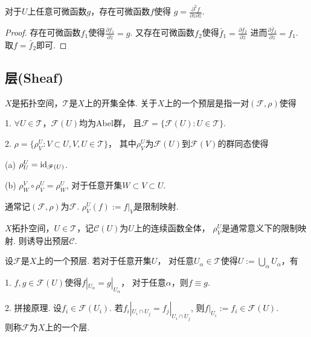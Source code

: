 \begin{corollary}
	对于$U$上任意可微函数$g$，存在可微函数$f$使得
    $g=\frac{\partial^2 f}{\partial z\partial \bar{z}}$.
\end{corollary}
		
\begin{proof}
	存在可微函数$f_1$使得$\frac{\partial f_1}{\partial \bar{z}}=g$. 
    又存在可微函数$f_2$使得$\bar{f}_1=\frac{\partial f_2}{\partial \bar{z}}$
    进而$\frac{\partial \bar{f}_2}{\partial z}=f_1$. 
    取$f=\bar{f}_2$即可.
\end{proof}
	

\subsection{层(Sheaf)}

\begin{definition}
	$X$是拓扑空间，$\mathscr{T}$是$X$上的开集全体. 
    关于$X$上的一个预层是指一对$(\mathscr{F},\rho)$使得

	1. $\forall U\in \mathscr{T}$，$\mathscr{F}(U)$均为Abel群，
    且$\mathscr{F}=\{\mathscr{F}(U):U\in \mathscr{T}\}$.\par
	2. $\rho=\{\rho_V^U: V\subset U, V,U\in \mathscr{T}\}$，
    其中$\rho_V^U$为$\mathscr{F}(U)$到$\mathscr{F}(V)$的群同态使得

	\qquad (a) $\rho^U_U=\operatorname{id}_{\mathscr{F}(U)}$.

	\qquad (b) $\rho_W^V\circ \rho_V^U=\rho_W^U$, 
    对于任意开集$W\subset V\subset U$.

    通常记$(\mathscr{F},\rho)$为$\mathscr{F}$. $\rho^U_V(f):=f|_V$是限制映射.
\end{definition}
		
\begin{example}
	$X$拓扑空间，$U\in \mathscr{T}$，记$\mathcal{C}(U)$为$U$上的连续函数全体，
    $\rho^U_V$是通常意义下的限制映射. 则诱导出预层$\mathcal{C}$.
\end{example}
		
\begin{definition}
	设$\mathscr{F}$是$X$上的一个预层. 若对于任意开集$U$，
    对任意$U_\alpha \in \mathscr{T}$使得$U:=\bigcup_\alpha U_\alpha$，有

	1. $f,g\in \mathscr{F}(U)$使得$f|_{U_\alpha}=g|_{U_\alpha}$，
    对于任意$\alpha$，则$f\equiv g$.\par
	2. 拼接原理. 设$f_i\in \mathscr{F}(U_i)$. 
    若$f_i|_{U_i\cap U_j}=f_j|_{U_i\cap U_j}$, 
    则$f|_{U_i}:=f_i\in \mathscr{F}(U)$.\\
	则称$\mathscr{F}$为$X$上的一个层.
\end{definition}
		
